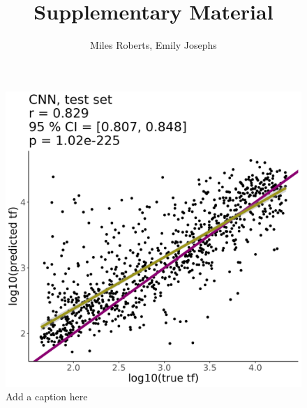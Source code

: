\documentclass[12pt, letterpaper]{article}
\title{Supplementary Material}
\author{Miles Roberts, Emily Josephs}
\begin{document}
\maketitle


\begin{figure}[!h]
    \centering
    \includegraphics[width=0.5\linewidth]{figures/supplement/a_supplmental_figure.png}
    \caption{Add a caption here}
    \label{fig:sup}
\end{figure}
\end{document}
